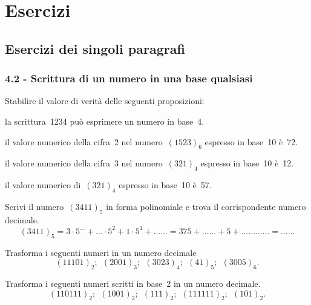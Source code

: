 \section{Esercizi}
\subsection{Esercizi dei singoli paragrafi}
\subsubsection*{4.2 - Scrittura di un numero in una base qualsiasi}

\begin{esercizio}
\label{ese:4.1}
Stabilire il valore di verità delle seguenti proposizioni:
\begin{enumeratea}
\TabPositions{12cm}
\item la scrittura~1234 può esprimere un numero in base~4. \tab\boxV\quad\boxF
\item il valore numerico della cifra~2 nel numero~$(1523)_{6}$ espresso in base~10 è~72.\tab\boxV\quad\boxF
\item il valore numerico della cifra~3 nel numero~$(321)_{4}$ espresso in base~10 è~12. \tab\boxV\quad\boxF
\item il valore numerico di~$(321)_{4}$ espresso in base~10 è~57. \tab\boxV\quad\boxF
\end{enumeratea}
\end{esercizio}

\begin{esercizio}
\label{ese:4.2}
Scrivi il numero~$(3411)_{5}$ in forma polinomiale e trova il corrispondente numero decimale.
\[
(3411)_{5}=3\cdot 5^{\ldots }+\ldots \cdot 5^{2}+1\cdot5^{1}+\ldots\ldots =375+\ldots\ldots +5+\ldots%
\ldots\ldots\ldots =\ldots\ldots\]
\end{esercizio}

\begin{esercizio}[\Ast]
\label{ese:4.3}
Trasforma i seguenti numeri in un numero
decimale
\[(11101)_{2};\:\:(2001)_{3};\:\:(3023)_{4};\:\:(41)_{5};\:\:(3005)_{6}.\]
\end{esercizio}

\begin{esercizio}[\Ast]
\label{ese:4.4}
Trasforma i seguenti numeri scritti in base~2 in un numero decimale.
\[(110111)_{2};\:\:(1001)_{2};\:\:(111)_{2};\:\:(111111)_{2};\:\:(101)_{2}.\]
\end{esercizio}

